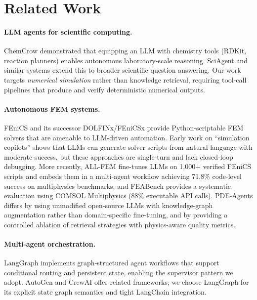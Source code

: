 \documentclass[preprint,review,12pt]{elsarticle}
\begin{document}
\section{Related Work}
\label{sec:related}

\paragraph{LLM agents for scientific computing.}
ChemCrow \citep{bran2023chemcrow} demonstrated that equipping an LLM with
chemistry tools (RDKit, reaction planners) enables autonomous laboratory-scale
reasoning.  SciAgent \citep{ma2024sciagent} and similar systems extend this
to broader scientific question answering.  Our work targets \emph{numerical
simulation} rather than knowledge retrieval, requiring tool-call pipelines that
produce and verify deterministic numerical outputs.

\paragraph{Autonomous FEM systems.}
FEniCS \citep{logg2012fenics} and its successor DOLFINx/FEniCSx
\citep{barrata2023dolfinx} provide Python-scriptable FEM solvers that are
amenable to LLM-driven automation.  Early work on ``simulation copilots''
\citep{bauer2023llm, jiang2024llm} shows that LLMs can generate solver
scripts from natural language with moderate success, but these approaches are
single-turn and lack closed-loop debugging.  More recently, ALL-FEM
\citep{deotale2026allfem} fine-tunes LLMs on 1{,}000+ verified FEniCS scripts
and embeds them in a multi-agent workflow achieving 71.8\% code-level success
on multiphysics benchmarks, and FEABench \citep{mudur2025feabench} provides a
systematic evaluation using COMSOL Multiphysics (88\% executable API calls).
PDE-Agents differs by using unmodified open-source LLMs with
knowledge-graph augmentation rather than domain-specific fine-tuning, and by
providing a controlled ablation of retrieval strategies with physics-aware
quality metrics.

\paragraph{Multi-agent orchestration.}
LangGraph \citep{langgraph2024} implements graph-structured agent workflows
that support conditional routing and persistent state, enabling the supervisor
pattern we adopt.  AutoGen \citep{wu2023autogen} and CrewAI \citep{crewai2024}
offer related frameworks; we choose LangGraph for its explicit
state graph semantics and tight LangChain integration.
\end{document}
